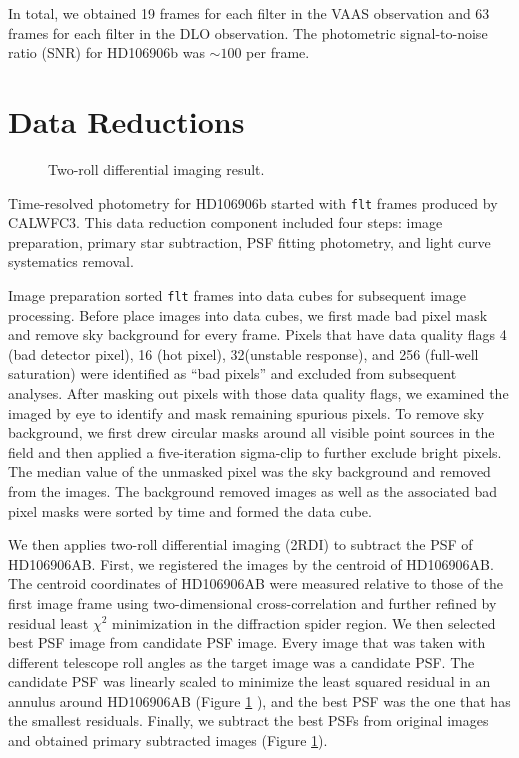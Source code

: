 \documentclass[modern]{aastex62}
\begin{document}
In total, we obtained 19 frames for each filter in the VAAS observation and 63 frames for each filter in the DLO observation. The photometric signal-to-noise ratio (SNR) for HD106906b was $\sim100$ per frame.

\section{Data Reductions}

\begin{figure}
  \centering
  \caption{Two-roll differential imaging result. }
  \label{fig:2rdi}
\end{figure}

Time-resolved photometry for HD106906b started with \texttt{flt} frames produced by CALWFC3. This data reduction component included four steps: image preparation, primary star subtraction, PSF fitting photometry, and light curve systematics removal.

Image preparation sorted \texttt{flt} frames into data cubes for subsequent image processing. Before place images into data cubes, we first made bad pixel mask and remove sky background for every frame. Pixels that have data quality flags 4 (bad detector pixel), 16 (hot pixel), 32(unstable response), and 256 (full-well saturation) were identified as ``bad pixels'' and excluded from subsequent analyses. After masking out pixels with those data quality flags, we examined the imaged by eye to identify and mask remaining spurious pixels. To remove sky background, we first drew circular masks around all visible point sources in the field and then applied a five-iteration sigma-clip to further exclude bright pixels. The median value of the unmasked pixel was the sky background and  removed from the images. The background removed images as well as the associated bad pixel masks were sorted by time and  formed the data cube.

We then applies two-roll differential imaging (2RDI) to subtract the PSF of HD106906AB. First, we registered the images by the centroid of HD106906AB. The centroid coordinates of HD106906AB were measured relative to those of the first image frame using two-dimensional cross-correlation and further refined by residual least $\chi^{2}$ minimization in the diffraction spider region. We then selected best PSF image from candidate PSF image. Every image that was taken with different telescope roll angles as the target image was a candidate PSF. The candidate PSF was linearly scaled to minimize the least squared residual in an annulus around HD106906AB (Figure \ref{fig:2rdi} ), and the best PSF was the one that has the smallest residuals. Finally, we subtract the best PSFs from original images and obtained primary subtracted images (Figure \ref{fig:2rdi}). 
\end{document}
